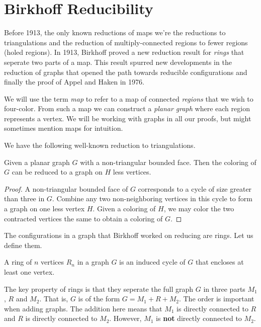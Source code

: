 \section{Birkhoff Reducibility}
\label{sec:birkhoff}

Before 1913, the only known reductions of maps we're the reductions to triangulations and the reduction of multiply-connected regions to fewer regions (holed regions). In 1913, Birkhoff \cite{birkhoff} proved a new reduction result for \textit{rings} that seperate two parts of a map. This result spurred new developments in the reduction of graphs that opened the path towards reducible configurations and finally the proof of Appel and Haken in 1976.

We will use the term \textit{map} to refer to a map of connected \textit{regions} that we wish to four-color. From such a map we can construct a \textit{planar graph} where each region represents a vertex. We will be working with graphs in all our proofs, but might sometimes mention maps for intuition.

We have the following well-known reduction to triangulations.

\begin{theorem}
    Given a planar graph $G$ with a non-triangular bounded face. Then the coloring of $G$ can be reduced to a graph on $H$ less vertices.
\end{theorem}
\begin{proof}
    A non-triangular bounded face of $G$ corresponds to a cycle of size greater than three in $G$. Combine any two non-neighboring vertices in this cycle to form a graph on one less vertex $H$. Given a coloring of $H$, we may color the two contracted vertices the same to obtain a coloring of $G$.
\end{proof}

The configurations in a graph that Birkhoff worked on reducing are rings. Let us define them.

\begin{definition}
    A ring of $n$ vertices $R_n$ in a graph $G$ is an induced cycle of $G$ that encloses at least one vertex.
\end{definition}

The key property of rings is that they seperate the full graph $G$ in three parts $M_1$, $R$ and $M_2$. That is, $G$ is of the form $G = M_1 + R + M_2$. The order is important when adding graphs. The addition here means that $M_1$ is directly connected to $R$ and $R$ is directly connected to $M_2$. However, $M_1$ is \textbf{not} directly connected to $M_2$. 

